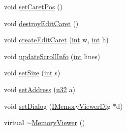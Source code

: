 \begin{DoxyCompactItemize}
void \mbox{\hyperlink{class_memory_viewer_abfed49727a6de1b52e5495ed96816759}{set\+Caret\+Pos}} ()
\item 
void \mbox{\hyperlink{class_memory_viewer_ab658d89232d31d190ac4e323d61c4b8f}{destroy\+Edit\+Caret}} ()
\item 
void \mbox{\hyperlink{class_memory_viewer_a73ddaf427846eedb7073ad6fc69001ac}{create\+Edit\+Caret}} (\mbox{\hyperlink{_util_8cpp_a0ef32aa8672df19503a49fab2d0c8071}{int}} w, \mbox{\hyperlink{_util_8cpp_a0ef32aa8672df19503a49fab2d0c8071}{int}} h)
\item 
void \mbox{\hyperlink{class_memory_viewer_aa133e5db4bf989efa18892de371c0f43}{update\+Scroll\+Info}} (\mbox{\hyperlink{_util_8cpp_a0ef32aa8672df19503a49fab2d0c8071}{int}} lines)
\item 
void \mbox{\hyperlink{class_memory_viewer_a185cb06e604ff1e0016b9be859c21387}{set\+Size}} (\mbox{\hyperlink{_util_8cpp_a0ef32aa8672df19503a49fab2d0c8071}{int}} s)
\item 
void \mbox{\hyperlink{class_memory_viewer_abe391051455e116889da0613c19888a2}{set\+Address}} (\mbox{\hyperlink{_system_8h_a10e94b422ef0c20dcdec20d31a1f5049}{u32}} a)
\item 
void \mbox{\hyperlink{class_memory_viewer_a546b937c21dfa976c99dc1891569e503}{set\+Dialog}} (\mbox{\hyperlink{class_i_memory_viewer_dlg}{I\+Memory\+Viewer\+Dlg}} $\ast$d)
\item 
virtual \mbox{\hyperlink{class_memory_viewer_a83792c0b253ba9095fa16a6ea05e4ccf}{$\sim$\+Memory\+Viewer}} ()
\end{DoxyCompactItemize}
